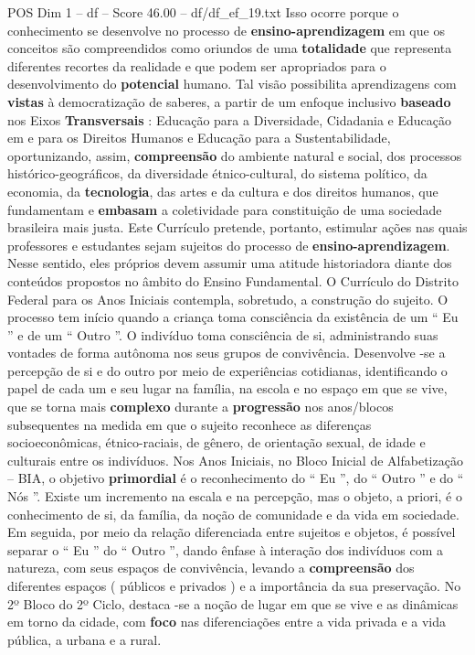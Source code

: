 \begin{textsample}{POS Dim 1 – df – Score 46.00 – df/df\_ef\_19.txt}
Isso ocorre porque o conhecimento se desenvolve no processo de \textbf{ensino-aprendizagem} em que os conceitos são compreendidos como oriundos de uma \textbf{totalidade} que representa diferentes recortes da realidade e que podem ser apropriados para o desenvolvimento do \textbf{potencial} humano.
Tal visão possibilita aprendizagens com \textbf{vistas} à democratização de saberes, a partir de um enfoque inclusivo \textbf{baseado} nos Eixos \textbf{Transversais} : Educação para a Diversidade, Cidadania e Educação em e para os Direitos Humanos e Educação para a Sustentabilidade, oportunizando, assim, \textbf{compreensão} do ambiente natural e social, dos processos histórico-geográficos, da diversidade étnico-cultural, do sistema político, da economia, da \textbf{tecnologia}, das artes e da cultura e dos direitos humanos, que fundamentam e \textbf{embasam} a coletividade para constituição de uma sociedade brasileira mais justa.
Este Currículo pretende, portanto, estimular ações nas quais professores e estudantes sejam sujeitos do processo de \textbf{ensino-aprendizagem}.
Nesse sentido, eles próprios devem assumir uma atitude historiadora diante dos conteúdos propostos no âmbito do Ensino Fundamental.
O Currículo do Distrito Federal para os Anos Iniciais contempla, sobretudo, a construção do sujeito.
O processo tem início quando a criança toma consciência da existência de um “ Eu ” e de um “ Outro ”.
O indivíduo toma consciência de si, administrando suas vontades de forma autônoma nos seus grupos de convivência.
Desenvolve -se a percepção de si e do outro por meio de experiências cotidianas, identificando o papel de cada um e seu lugar na família, na escola e no espaço em que se vive, que se torna mais \textbf{complexo} durante a \textbf{progressão} nos anos/blocos subsequentes na medida em que o sujeito reconhece as diferenças socioeconômicas, étnico-raciais, de gênero, de orientação sexual, de idade e culturais entre os indivíduos.
Nos Anos Iniciais, no Bloco Inicial de Alfabetização – BIA, o objetivo \textbf{primordial} é o reconhecimento do “ Eu ”, do “ Outro ” e do “ Nós ”.
Existe um incremento na escala e na percepção, mas o objeto, a priori, é o conhecimento de si, da família, da noção de comunidade e da vida em sociedade.
Em seguida, por meio da relação diferenciada entre sujeitos e objetos, é possível separar o “ Eu ” do “ Outro ”, dando ênfase à interação dos indivíduos com a natureza, com seus espaços de convivência, levando a \textbf{compreensão} dos diferentes espaços ( públicos e privados ) e a importância da sua preservação.
No 2º Bloco do 2º Ciclo, destaca -se a noção de lugar em que se vive e as dinâmicas em torno da cidade, com \textbf{foco} nas diferenciações entre a vida privada e a vida pública, a urbana e a rural.

\end{textsample}
